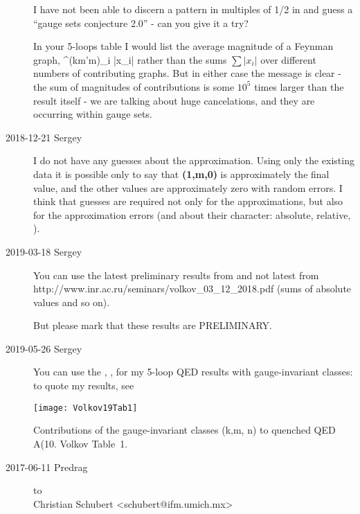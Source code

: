 \begin{description}
I have not been able to discern a pattern in multiples of 1/2 in
 and guess a ``gauge sets conjecture 2.0'' - can you
give it a try?

In your 5-loops table I would list the average magnitude of a Feynman graph,
\beq
{} \sum^{({km'm})}_i |x_i|
rather than the sums $\sum |x_i|$ over different numbers of contributing
graphs. But in either case the message is clear - the sum of magnitudes
of contributions is some $10^5$ times larger than the result itself - we
are talking about huge cancelations, and they are occurring within gauge
sets.

\item[2018-12-21 Sergey]
I do not have any guesses about the approximation. Using only the
existing data it is possible only to say that {\bf (1,m,0)} is
approximately the final value, and the other values are approximately
zero with random errors. I think that guesses are required not only for
the approximations, but also for the approximation errors (and about
their character: absolute, relative, \etc).

\item[2019-03-18 Sergey]
You can use the latest preliminary results from
and not latest from
{http://www.inr.ac.ru/seminars/volkov\_03\_12\_2018.pdf}
(sums of absolute values and so on).

But please mark that these results are PRELIMINARY.

\item[2019-05-26 Sergey]
You can use the , , for my 5-loop QED results with gauge-invariant classes:
to quote my results, see

\begin{table}
\begin{center}
\texttt{[image: Volkov19Tab1]}
\end{center}
\caption{\label{Volkov19Tab1}
Contributions of the gauge-invariant classes (k,m, n) to quenched QED A(10.
Volkov Table~1.
}
\end{table}








\item[2017-06-11 Predrag] to
\\
Christian Schubert <schubert@ifm.umich.mx>
%
%


\end{description}
